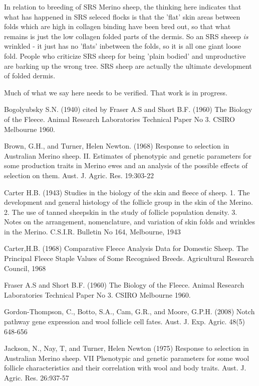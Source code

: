 \documentclass[titlepage]{article}  %
\begin{document}
In relation to breeding of SRS Merino sheep, the thinking here indicates that what has happened in SRS seleced flocks is that the 'flat' skin areas between folds which are high in collagen binding have been bred out, so that what remains is just the low collagen folded parts of the dermis. So an SRS sheeep {\em is} wrinkled - it just has no 'flats' inbetween the folds, so it is all one giant loose fold. People who criticize SRS sheep for being 'plain bodied' and unproductive are barking up the wrong tree. SRS sheep are actually the ultimate development of folded dermis. 

Much of what we say here needs to be verified. That work is in progress.




\clearpage
\begin{thebibliography}{99}

 Bogolyubsky S.N. (1940) cited by Fraser A.S and Short B.F. (1960) The Biology of the Fleece. Animal Research Laboratories Technical Paper No 3. CSIRO Melbourne 1960.

Brown, G.H., and Turner, Helen Newton. (1968) Response to selection in Australian Merino sheep. II. Estimates of phenotypic and genetic parameters for some production traits in Merino ewes and an analysis of the possible effects of selection on them. Aust. J. Agric. Res. 19:303-22

Carter H.B. (1943) Studies in the biology of the skin and fleece of sheep. 1. The development and general histology of the follicle group in the skin of the Merino. 2. The use of tanned sheepskin in the study of follicle population density. 3. Notes on the arrangement, nomenclature, and variation of skin folds and wrinkles in the Merino. C.S.I.R. Bulletin No 164, Melbourne, 1943

Carter,H.B. (1968) Comparative Fleece Analysis Data for Domestic Sheep. The Principal Fleece Staple Values of Some Recognised Breeds. Agricultural Research Council, 1968

Fraser A.S and Short B.F. (1960) The Biology of the Fleece. Animal Research Laboratories Technical Paper No 3. CSIRO Melbourne 1960.

Gordon-Thompson, C., Botto, S.A., Cam, G.R., and Moore, G.P.H. (2008) Notch pathway gene expression and wool follicle cell fates. Aust. J. Exp. Agric. 48(5) 648-656

Jackson, N., Nay, T, and Turner, Helen Newton (1975) Response to selection in Australian Merino sheep. VII Phenotypic and genetic parameters for some wool follicle characteristics and their correlation with wool and body traits. Aust. J. Agric. Res. 26:937-57


\end{thebibliography}
\end{document}
